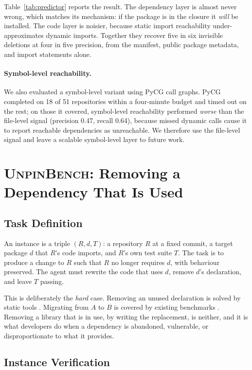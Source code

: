 \documentclass[11pt]{article}
\newcommand{\bench}{\textsc{UnpinBench}}
\begin{document}
Table~\ref{tab:predictor} reports the result.
The dependency layer is almost never wrong, which matches its mechanism: if the package is in the closure it \emph{will} be installed.
The code layer is noisier, because static import reachability under-approximates dynamic imports.
Together they recover five in six invisible deletions at four in five precision, from the manifest, public package metadata, and import statements alone.

\paragraph{Symbol-level reachability.}
We also evaluated a symbol-level variant using PyCG \citep{pycg2021} call graphs.
PyCG completed on 18 of 51 repositories within a four-minute budget and timed out on the rest; on those it covered, symbol-level reachability performed \emph{worse} than the file-level signal (precision 0.47, recall 0.64), because missed dynamic calls cause it to report reachable dependencies as unreachable.
We therefore use the file-level signal and leave a scalable symbol-level layer to future work.

\section{\bench: Removing a Dependency That Is Used}
\label{sec:benchmark}

\subsection{Task Definition}

An instance is a triple $(R, d, T)$: a repository $R$ at a fixed commit, a target package $d$ that $R$'s code imports, and $R$'s own test suite $T$.
The task is to produce a change to $R$ such that $R$ no longer requires $d$, with behaviour preserved.
The agent must rewrite the code that uses $d$, remove $d$'s declaration, and leave $T$ passing.

This is deliberately the \emph{hard} case.
Removing an unused declaration is solved by static tools \citep{pytrim2025,soto2021longitudinal}.
Migrating from $A$ to $B$ is covered by existing benchmarks \citep{pymigbench2023,migrationbench2025}.
Removing a library that is in use, by writing the replacement, is neither, and it is what developers do when a dependency is abandoned, vulnerable, or disproportionate to what it provides.

\subsection{Instance Verification}
\end{document}
